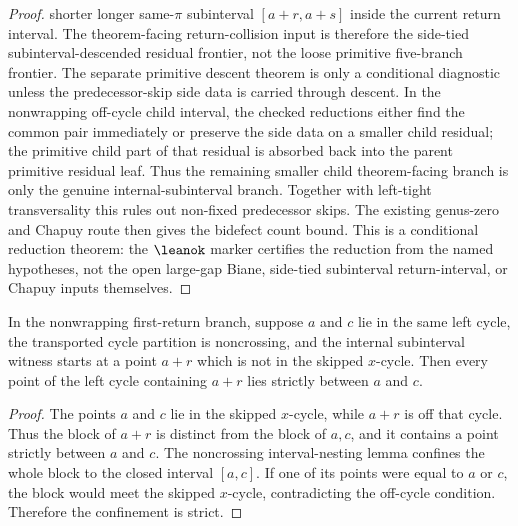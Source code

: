 \begin{proof}
  shorter longer same-\(\pi\) subinterval \([a+r,a+s]\) inside the current
  return interval.  The theorem-facing return-collision input is therefore the
  side-tied subinterval-descended residual frontier, not the loose primitive
  five-branch frontier.  The separate primitive descent theorem is only a
  conditional diagnostic unless the predecessor-skip side data is carried
  through descent.  In the nonwrapping off-cycle child interval, the checked
  reductions either find the common pair immediately or preserve the side data
  on a smaller child residual; the primitive child part of that residual is
  absorbed back into the parent primitive residual leaf.  Thus the remaining
  smaller child theorem-facing branch is only the genuine
  internal-subinterval branch.
  Together with left-tight transversality this rules out
  non-fixed predecessor skips.  The existing genus-zero and Chapuy route then
  gives the bidefect count bound.  This is a conditional reduction theorem:
  the \(\leanok\)
  marker certifies the reduction from the named hypotheses, not the open
  large-gap Biane, side-tied subinterval return-interval, or Chapuy inputs
  themselves.
\end{proof}

\begin{theorem}
  \label{thm:off-cycle-block-confinement}
  \leanok
  In the nonwrapping first-return branch, suppose \(a\) and \(c\) lie in the
  same left cycle, the transported cycle partition is noncrossing, and the
  internal subinterval witness starts at a point \(a+r\) which is not in the
  skipped \(x\)-cycle.  Then every point of the left cycle containing \(a+r\)
  lies strictly between \(a\) and \(c\).
\end{theorem}

\begin{proof}
  \leanok
  The points \(a\) and \(c\) lie in the skipped \(x\)-cycle, while \(a+r\) is
  off that cycle.  Thus the block of \(a+r\) is distinct from the block of
  \(a,c\), and it contains a point strictly between \(a\) and \(c\).  The
  noncrossing interval-nesting lemma confines the whole block to the closed
  interval \([a,c]\).  If one of its points were equal to \(a\) or \(c\), the
  block would meet the skipped \(x\)-cycle, contradicting the off-cycle
  condition.  Therefore the confinement is strict.
\end{proof}

